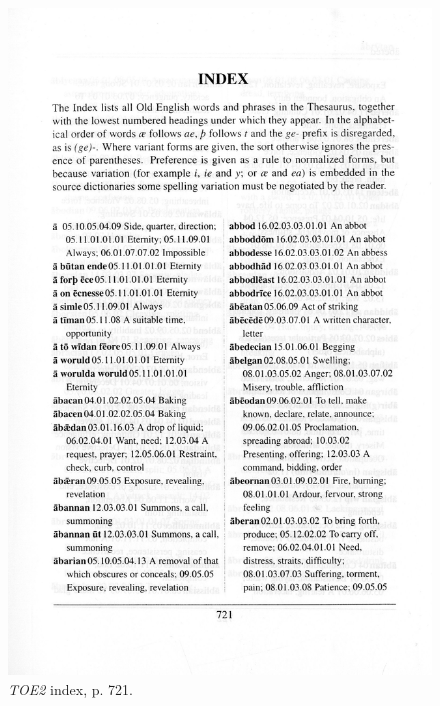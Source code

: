 \begin{figure}[htbp]
  \centering
    \includegraphics[width=\linewidth]{Stolk_thes-content/fig/thes/TOE2-p721.jpg}
  \caption{\textit{TOE2} index, p. 721.}
  \label{fig:1.A:TOE2:index}
\end{figure}



